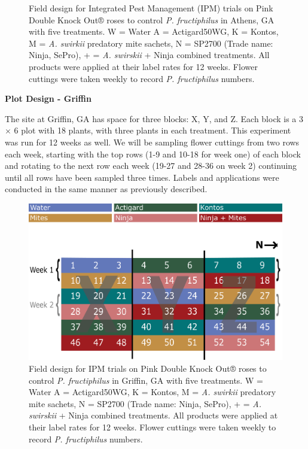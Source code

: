 \documentclass[12pt,final,CPage]{ufthesis}
\begin{document}
{\begin{figure}
{  }

  \caption[Field design for Integrated Pest Management (IPM) trials on Pink Double Knock Out® roses to control \textit{P. fructiphilus} in Athens, GA with five treatments]{Field design for Integrated Pest Management (IPM) trials on Pink Double Knock Out® roses to control \textit{P. fructiphilus} in Athens, GA with five treatments. W = Water A = Actigard50WG, K = Kontos, M = \textit{A. swirkii} predatory mite sachets, N = SP2700 (Trade name: Ninja, SePro), + = \textit{A. swirskii} + Ninja combined treatments. All products were applied at their label rates for 12 weeks. Flower cuttings were taken weekly to record \textit{P. fructiphilus} numbers.}\label{fig:ipm-athens}
  \end{figure}
  \textbf{Plot Design - Griffin}

  The site at Griffin, GA has space for three blocks: X, Y, and Z. Each block is a 3 \(\times\) 6 plot with 18 plants, with three plants in each treatment. This experiment was run for 12 weeks as well. We will be sampling flower cuttings from two rows each week, starting with the top rows (1-9 and 10-18 for week one) of each block and rotating to the next row each week (19-27 and 28-36 on week 2) continuing until all rows have been sampled three times. Labels and applications were conducted in the same manner as previously described.
  \begin{figure}

  {\centering \includegraphics[width=0.8\linewidth]{figure/rrv_ipm_plot_map_2019_griffin} 

  }

  \caption[Field design for IPM trials on Pink Double Knock Out® roses to control \textit{P. fructiphilus} in Griffin, GA with five treatments]{Field design for IPM trials on Pink Double Knock Out® roses to control \textit{P. fructiphilus} in Griffin, GA with five treatments. W = Water A = Actigard50WG, K = Kontos, M = \textit{A. swirkii} predatory mite sachets, N = SP2700 (Trade name: Ninja, SePro), + = \textit{A. swirskii} + Ninja combined treatments. All products were applied at their label rates for 12 weeks. Flower cuttings were taken weekly to record \textit{P. fructiphilus} numbers.}\label{fig:ipm-griff}
  \end{figure}
  \begin{figure}


\end{figure}}
\end{document}
